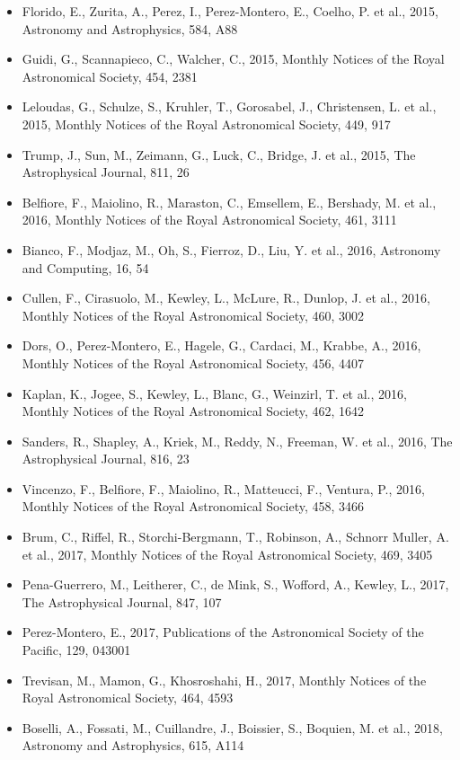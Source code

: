\documentclass{letter}
\begin{document}
\begin{enumerate}
\begin{itemize}
\item Florido, E., Zurita, A., Perez, I., Perez-Montero, E., Coelho, P. et al., 2015, Astronomy and Astrophysics, 584, A88
\item Guidi, G., Scannapieco, C., Walcher, C., 2015, Monthly Notices of the Royal Astronomical Society, 454, 2381
\item Leloudas, G., Schulze, S., Kruhler, T., Gorosabel, J., Christensen, L. et al., 2015, Monthly Notices of the Royal Astronomical Society, 449, 917
\item Trump, J., Sun, M., Zeimann, G., Luck, C., Bridge, J. et al., 2015, The Astrophysical Journal, 811, 26
\item Belfiore, F., Maiolino, R., Maraston, C., Emsellem, E., Bershady, M. et al., 2016, Monthly Notices of the Royal Astronomical Society, 461, 3111
\item Bianco, F., Modjaz, M., Oh, S., Fierroz, D., Liu, Y. et al., 2016, Astronomy and Computing, 16, 54
\item Cullen, F., Cirasuolo, M., Kewley, L., McLure, R., Dunlop, J. et al., 2016, Monthly Notices of the Royal Astronomical Society, 460, 3002
\item Dors, O., Perez-Montero, E., Hagele, G., Cardaci, M., Krabbe, A., 2016, Monthly Notices of the Royal Astronomical Society, 456, 4407
\item Kaplan, K., Jogee, S., Kewley, L., Blanc, G., Weinzirl, T. et al., 2016, Monthly Notices of the Royal Astronomical Society, 462, 1642
\item Sanders, R., Shapley, A., Kriek, M., Reddy, N., Freeman, W. et al., 2016, The Astrophysical Journal, 816, 23
\item Vincenzo, F., Belfiore, F., Maiolino, R., Matteucci, F., Ventura, P., 2016, Monthly Notices of the Royal Astronomical Society, 458, 3466
\item Brum, C., Riffel, R., Storchi-Bergmann, T., Robinson, A., Schnorr Muller, A. et al., 2017, Monthly Notices of the Royal Astronomical Society, 469, 3405
\item Pena-Guerrero, M., Leitherer, C., de Mink, S., Wofford, A., Kewley, L., 2017, The Astrophysical Journal, 847, 107
\item Perez-Montero, E., 2017, Publications of the Astronomical Society of the Pacific, 129, 043001
\item Trevisan, M., Mamon, G., Khosroshahi, H., 2017, Monthly Notices of the Royal Astronomical Society, 464, 4593
\item Boselli, A., Fossati, M., Cuillandre, J., Boissier, S., Boquien, M. et al., 2018, Astronomy and Astrophysics, 615, A114

\end{itemize}
\end{enumerate}
\end{document}
